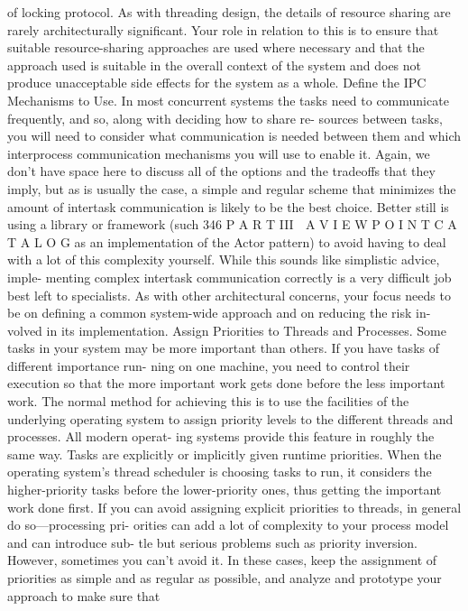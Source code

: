 of locking protocol. As with threading design, the details of resource sharing
are rarely architecturally significant. Your role in relation to this is to ensure
that suitable resource-sharing approaches are used where necessary and
that the approach used is suitable in the overall context of the system and
does not produce unacceptable side effects for the system as a whole.
Define the IPC Mechanisms to Use. In most concurrent systems the tasks
need to communicate frequently, and so, along with deciding how to share re-
sources between tasks, you will need to consider what communication is
needed between them and which interprocess communication mechanisms
you will use to enable it. Again, we don’t have space here to discuss all of the
options and the tradeoffs that they imply, but as is usually the case, a simple
and regular scheme that minimizes the amount of intertask communication is
likely to be the best choice. Better still is using a library or framework (such
346
 P A R T III  A V I E W P O I N T C A T A L O G
as an implementation of the Actor pattern) to avoid having to deal with a lot
of this complexity yourself. While this sounds like simplistic advice, imple-
menting complex intertask communication correctly is a very difficult job best
left to specialists. As with other architectural concerns, your focus needs to be
on defining a common system-wide approach and on reducing the risk in-
volved in its implementation.
Assign Priorities to Threads and Processes. Some tasks in your system may
be more important than others. If you have tasks of different importance run-
ning on one machine, you need to control their execution so that the more
important work gets done before the less important work. The normal method
for achieving this is to use the facilities of the underlying operating system to
assign priority levels to the different threads and processes. All modern operat-
ing systems provide this feature in roughly the same way. Tasks are explicitly
or implicitly given runtime priorities. When the operating system’s thread
scheduler is choosing tasks to run, it considers the higher-priority tasks before
the lower-priority ones, thus getting the important work done first. If you can
avoid assigning explicit priorities to threads, in general do so—processing pri-
orities can add a lot of complexity to your process model and can introduce sub-
tle but serious problems such as priority inversion. However, sometimes you
can’t avoid it. In these cases, keep the assignment of priorities as simple and as
regular as possible, and analyze and prototype your approach to make sure that
